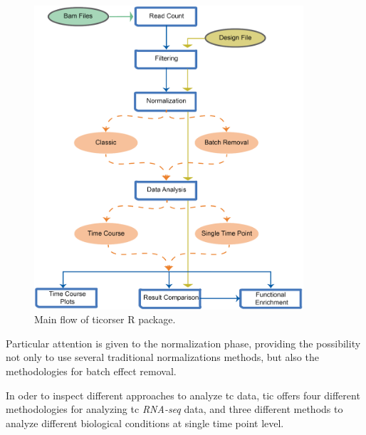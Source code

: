 \begin{figure}[H]
\centering
\includegraphics[width=10cm, keepaspectratio]{img/ticorser/main_flow.pdf}
\caption[ticorser mainflow]{Main flow of ticorser R package.}
\label{fig:ticorserflow}
\end{figure}
 
Particular attention is given to the normalization phase, providing the possibility not only to use several traditional normalizations methods, but also the methodologies for batch effect removal.

In oder to inspect different approaches to analyze \gls{tc} data, \gls{tic} offers four different methodologies for analyzing \gls{tc} \textit{RNA-seq} data, and three different methods to analyze different biological conditions at single time point level.


